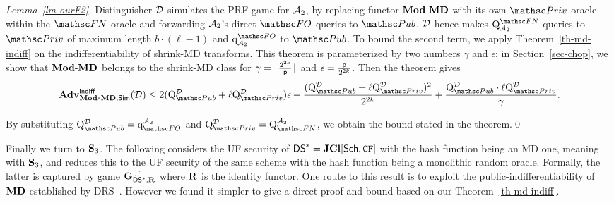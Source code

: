 \begin{proof}[Lemma~\ref{lm-ourF2}]
	Distinguisher $\mathcal{D}$ simulates the PRF game for $\mathcal{A}_2$, by replacing functor $\mathbf{Mod\mbox{-}MD}$ with its own $\PrivO$ oracle within the $\FUNCO$ oracle and forwarding $\mathcal{A}_2$'s direct $\HASH$ queries to $\PubO$.
	$\mathcal{D}$ hence makes $\Queries{\advA_2}{\FUNCO}$ queries to $\PrivO$ of maximum length $b \cdot (\ell-1)$ and $\QueriesD{\advA_2}{\HASH}$ to $\PubO$. 
	To bound the second term, we apply Theorem~\ref{th-md-indiff} on the indifferentiability of shrink-MD transforms.
	This theorem is parameterized by two numbers $\gamma$ and $\epsilon$; 
	in Section~\ref{sec-chop}, we show that $\mathbf{Mod\mbox{-}MD}$ belongs to the shrink-MD class for $\gamma = \lfloor \frac{2^{2k}}{\mathsf{p}} \rfloor$ and $\epsilon = \frac{\mathsf{p}}{2^{2k}}$.
	Then the theorem gives
	\[\genAdv{\indiff}{\ModMD, \simulator}{\advD} \leq 2(\Queries{\PubO}{\advD}+ \ell \Queries{\PrivO}{\advD}) \epsilon
	+ \frac{(\Queries{\PubO}{\advD} + \ell \Queries{\PrivO}{\advD})^2}{2^{2k}} 
	+ \frac{ \Queries{\PubO}{\advD} \cdot \ell \Queries{\PrivO}{\advD}}{\gamma}.\]
	
	By substituting $\Queries{\PubO}{\advD} = \QueriesD{\HASH}{\advA_2}$ and $\Queries{\PrivO}{\advD} = \Queries{\FUNCO}{\advA_2}$, we obtain the bound stated in the theorem.\qed
\end{proof}

Finally we turn to $\mathbf{S}_3$. The following considers the UF security of $\mathsf{DS}^* = \mathbf{JCl}[\mathsf{Sch},\mathtt{CF}]$ with the hash function being an MD one,  meaning with $\mathbf{S}_3$, and reduces this to the UF security of the same scheme with the hash function being a monolithic random oracle. Formally, the latter is captured by game $\mathbf{G}^{\mathrm{uf}}_{\mathsf{DS}^*,\mathbf{R}}$ where $\mathbf{R}$ is the identity functor. One route to this result is to exploit the public-indifferentiability of $\mathbf{MD}$ established by DRS~\cite{EC:DodRisShr09}. However we found it simpler to give a direct proof and bound based on our Theorem~\ref{th-md-indiff}.


